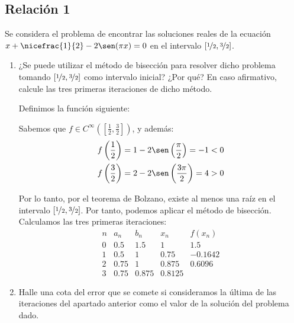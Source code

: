\subsection{Relación 1}
\setcounter{ejercicio}{0}

\begin{ejercicio}\label{ej:1.1.1}
    Se considera el problema de encontrar las soluciones reales de la ecuación $x + \nicefrac{1}{2} - 2\sen(\pi x) = 0$ en el intervalo $\left[\nicefrac{1}{2},\nicefrac{3}{2}\right]$.
    \begin{enumerate}
        \item ¿Se puede utilizar el método de bisección para resolver dicho problema tomando $\left[\nicefrac{1}{2},\nicefrac{3}{2}\right]$ como intervalo inicial? ¿Por qué? En caso afirmativo, calcule las tres primeras iteraciones de dicho método.
        
        Definimos la función siguiente:

        Sabemos que $f\in C^{\infty}\left(\left[\frac{1}{2},\frac{3}{2}\right]\right)$, y además:
        \begin{align*}
            f\left(\frac{1}{2}\right)&=1-2\sen\left(\frac{\pi}{2}\right)=-1<0\\
            f\left(\frac{3}{2}\right)&=2-2\sen\left(\frac{3\pi}{2}\right)=4>0
        \end{align*}

        Por lo tanto, por el teorema de Bolzano, existe al menos una raíz en el intervalo $\left[\nicefrac{1}{2},\nicefrac{3}{2}\right]$. Por tanto, podemos aplicar el método de bisección.
        Calculamos las tres primeras iteraciones:
        \begin{equation*}
            \begin{array}{c|cccc}
                n & a_n & b_n & x_n & f(x_n)\\
                \hline
                0 & 0.5 & 1.5 & 1 & 1.5\\
                1 & 0.5 & 1 & 0.75 & -0.1642\\
                2 & 0.75 & 1 & 0.875 & 0.6096\\
                3 & 0.75 & 0.875 & 0.8125
            \end{array}
        \end{equation*}
        \item Halle una cota del error que se comete si consideramos la última de las iteraciones del apartado anterior como el valor de la solución del problema dado.
        

\end{enumerate}
\end{ejercicio}
